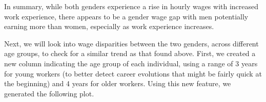 \documentclass[
  letterpaper,
  DIV=11,
  numbers=noendperiod]{scrartcl}
\newenvironment{Shaded}{\begin{snugshade}}{\end{snugshade}}
\newcommand{\CommentTok}[1]{\textcolor[rgb]{0.37,0.37,0.37}{#1}}
\newcommand{\DecValTok}[1]{\textcolor[rgb]{0.68,0.00,0.00}{#1}}
\newcommand{\FunctionTok}[1]{\textcolor[rgb]{0.28,0.35,0.67}{#1}}
\newcommand{\NormalTok}[1]{\textcolor[rgb]{0.00,0.23,0.31}{#1}}
\newcommand{\OtherTok}[1]{\textcolor[rgb]{0.00,0.23,0.31}{#1}}
\newcommand{\SpecialCharTok}[1]{\textcolor[rgb]{0.37,0.37,0.37}{#1}}
\newcommand{\StringTok}[1]{\textcolor[rgb]{0.13,0.47,0.30}{#1}}
\begin{document}
In summary, while both genders experience a rise in hourly wages with
increased work experience, there appears to be a gender wage gap with
men potentially earning more than women, especially as work experience
increases.

Next, we will look into wage disparities between the two genders, across
different age groups, to check for a similar trend as that found above.
First, we created a new column indicating the age group of each
individual, using a range of 3 years for young workers (to better detect
career evolutions that might be fairly quick at the beginning) and 4
years for older workers. Using this new feature, we generated the
following plot.

\begin{Shaded}
\end{Shaded}
\end{document}
